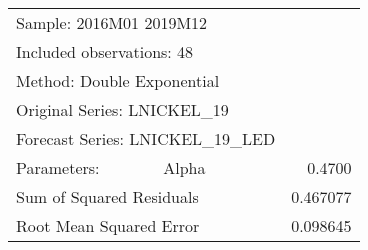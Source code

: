 
\begin{tabular}{lrrrr}
\toprule
\multicolumn{3}{l}{Sample: 2016M01 2019M12}&\multicolumn{1}{c}{}&\multicolumn{1}{c}{}\\
\multicolumn{3}{l}{Included observations: 48}&\multicolumn{1}{c}{}&\multicolumn{1}{c}{}\\
\multicolumn{3}{l}{Method: Double Exponential}&\multicolumn{1}{c}{}&\multicolumn{1}{c}{}\\
\multicolumn{3}{l}{Original Series: LNICKEL\_19}&\multicolumn{1}{c}{}&\multicolumn{1}{c}{}\\
\multicolumn{4}{l}{Forecast Series: LNICKEL\_19\_LED}&\multicolumn{1}{c}{}\\
\midrule
\multicolumn{1}{l}{Parameters:}&\multicolumn{1}{l}{Alpha}&\multicolumn{1}{c}{}&\multicolumn{1}{c}{}&\multicolumn{1}{r}{0.4700}\\
\multicolumn{3}{l}{Sum of Squared Residuals}&\multicolumn{1}{c}{}&\multicolumn{1}{r}{0.467077}\\
\multicolumn{3}{l}{Root Mean Squared Error}&\multicolumn{1}{c}{}&\multicolumn{1}{r}{0.098645}\\
\bottomrule
\end{tabular}
